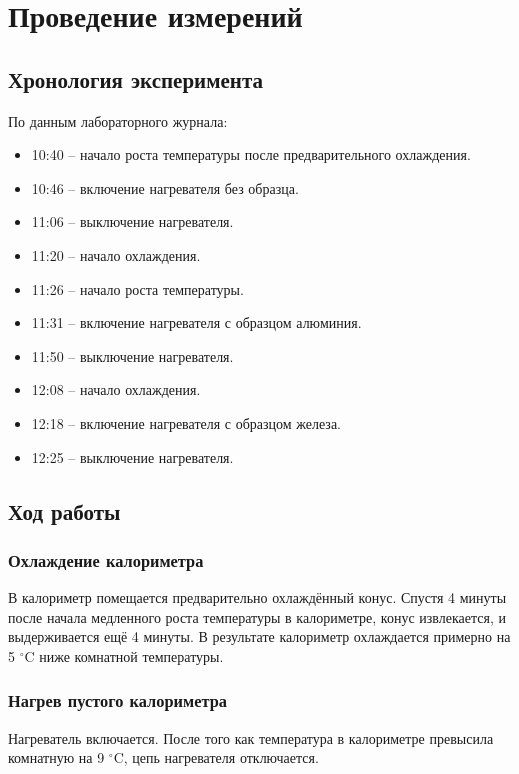 \documentclass[a4paper,12pt]{article}
\begin{document}
\section{Проведение измерений}

\subsection{Хронология эксперимента}
По данным лабораторного журнала:
\begin{itemize}
    \item 10:40 – начало роста температуры после предварительного охлаждения.
    \item 10:46 – включение нагревателя без образца.
    \item 11:06 – выключение нагревателя.
    \item 11:20 – начало охлаждения.
    \item 11:26 – начало роста температуры.
    \item 11:31 – включение нагревателя с образцом алюминия.
    \item 11:50 – выключение нагревателя.
    \item 12:08 – начало охлаждения.
    \item 12:18 – включение нагревателя с образцом железа.
    \item 12:25 – выключение нагревателя.
\end{itemize}

\subsection{Ход работы}

\subsubsection{Охлаждение калориметра}
В калориметр помещается предварительно охлаждённый конус. Спустя 4 минуты после начала медленного роста температуры в калориметре, конус извлекается, и выдерживается ещё 4 минуты. В результате калориметр охлаждается примерно на 5 $^\circ$C ниже комнатной температуры.

\subsubsection{Нагрев пустого калориметра}
Нагреватель включается. После того как температура в калориметре превысила комнатную на 9 $^\circ$C, цепь нагревателя отключается.
\end{document}
